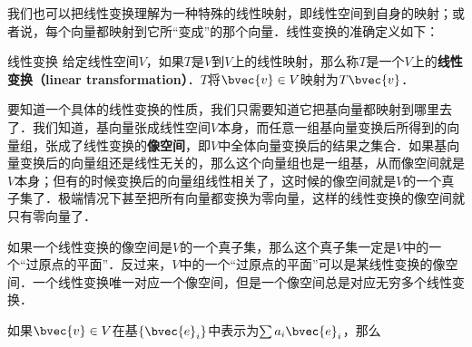 我们也可以把线性变换理解为一种特殊的线性映射，即线性空间到自身的映射；或者说，每个向量都映射到它所“变成”的那个向量．线性变换的准确定义如下：

\begin{definition}{线性变换}
给定线性空间$V$，如果$T$是$V$到$V$上的线性映射，那么称$T$是一个$V$上的\textbf{线性变换（linear transformation）}．$T$将$\bvec{v}\in V$映射为$T\bvec{v}$．
\end{definition}

要知道一个具体的线性变换的性质，我们只需要知道它把基向量都映射到哪里去了．我们知道，基向量张成线性空间$V$本身，而任意一组基向量变换后所得到的向量组，张成了线性变换的\textbf{像空间}，即$V$中全体向量变换后的结果之集合．如果基向量变换后的向量组还是线性无关的，那么这个向量组也是一组基，从而像空间就是$V$本身；但有的时候变换后的向量组线性相关了，这时候的像空间就是$V$的一个真子集了．极端情况下甚至把所有向量都变换为零向量，这样的线性变换的像空间就只有零向量了．

如果一个线性变换的像空间是$V$的一个真子集，那么这个真子集一定是$V$中的一个“过原点的平面”．反过来，$V$中的一个“过原点的平面”可以是某线性变换的像空间．一个线性变换唯一对应一个像空间，但是一个像空间总是对应无穷多个线性变换．

如果$\bvec{v}\in V$在基$\{\bvec{e}_i\}$中表示为$\sum a_i\bvec{e}_i$，那么

